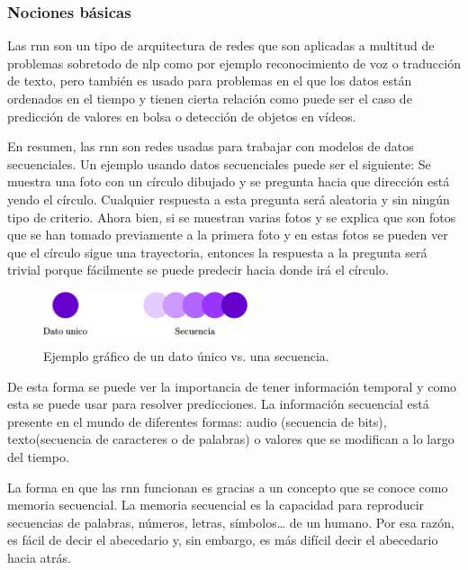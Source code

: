 \subsubsection{Nociones básicas}\label{rnn_theory}
Las \acrfull{rnn} son un tipo de arquitectura de redes que son aplicadas a multitud de problemas sobretodo de \acrfull{nlp} como por ejemplo reconocimiento de voz o traducción de texto, pero también es usado para problemas en el que los datos están ordenados en el tiempo y tienen cierta relación como puede ser el caso de predicción de valores en bolsa o detección de objetos en vídeos.
\newline

En resumen, las \acrshort{rnn} son redes usadas para trabajar con modelos de datos secuenciales. Un ejemplo usando datos secuenciales puede ser el siguiente: Se muestra una foto con un círculo dibujado y se pregunta hacia que dirección está yendo el círculo. Cualquier respuesta a esta pregunta será aleatoria y sin ningún tipo de criterio. Ahora bien, si se muestran varias fotos y se explica que son fotos que se han tomado previamente a la primera foto y en estas fotos se pueden ver que el círculo sigue una trayectoria, entonces la respuesta a la pregunta será trivial porque fácilmente se puede predecir hacia donde irá el círculo.

\begin{figure}[H]
    \centering
    \includegraphics[width=6cm]{images/state-of-art/rnn/ball.png}
    \caption{Ejemplo gráfico de un dato único vs. una secuencia.}
    \label{fig:basic_network}
\end{figure}

De esta forma se puede ver la importancia de tener información temporal y como esta se puede usar para resolver predicciones. La información secuencial está presente en el mundo de diferentes formas: audio (secuencia de bits), texto(secuencia de caracteres o de palabras) o valores que se modifican a lo largo del tiempo.
\newline

La forma en que las \acrshort{rnn} funcionan es gracias a un concepto que se conoce como memoria secuencial. La memoria secuencial es la capacidad para reproducir secuencias de palabras, números, letras, símbolos… de un humano. Por esa razón, es fácil de decir el abecedario y, sin embargo, es más difícil decir el abecedario hacia atrás.
\newline


